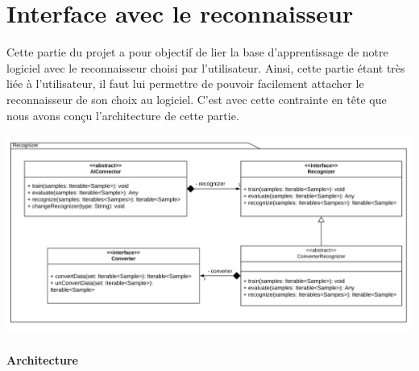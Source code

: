 \section{Interface avec le reconnaisseur}

Cette partie du projet a pour objectif de lier la base d'apprentissage de notre logiciel avec le reconnaisseur choisi par l'utilisateur. Ainsi, cette partie étant très liée à l'utilisateur, il faut lui permettre de pouvoir facilement attacher le reconnaisseur de son choix au logiciel. C'est avec cette contrainte en tête que nous avons conçu l'architecture de cette partie.

\begin{mdframed}[frametitle={Figure 12 : Architecture de l'interface avec le reconnaisseur}, innerbottommargin=10]
\begin{center}
\includegraphics[trim={0, 0, 0, 0}, scale=0.55]{assets/UML_Recognizer.pdf}
\end{center}
\end{mdframed}

\paragraph{Architecture}

